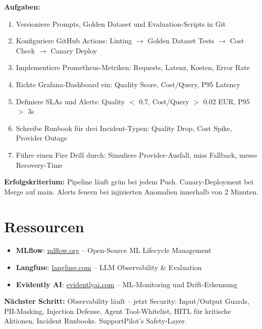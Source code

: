 \textbf{Aufgaben:}
\begin{enumerate}[leftmargin=*]
    \item Versioniere Prompts, Golden Dataset und Evaluation-Scripts in Git
    \item Konfiguriere GitHub Actions: Linting $\rightarrow$ Golden Dataset Tests $\rightarrow$ Cost Check $\rightarrow$ Canary Deploy
    \item Implementiere Prometheus-Metriken: Requests, Latenz, Kosten, Error Rate
    \item Richte Grafana-Dashboard ein: Quality Score, Cost/Query, P95 Latency
    \item Definiere SLAs und Alerts: Quality $<$ 0.7, Cost/Query $>$ 0.02 EUR, P95 $>$ 3s
    \item Schreibe Runbook für drei Incident-Typen: Quality Drop, Cost Spike, Provider Outage
    \item Führe einen Fire Drill durch: Simuliere Provider-Ausfall, miss Fallback, messe Recovery-Time
\end{enumerate}

\textbf{Erfolgskriterium:} Pipeline läuft grün bei jedem Push. Canary-Deployment bei Merge auf main. Alerts feuern bei injizierten Anomalien innerhalb von 2 Minuten.

\section{Ressourcen}

\begin{itemize}[leftmargin=*]
    \item \textbf{MLflow}: \href{https://mlflow.org}{mlflow.org} -- Open-Source ML Lifecycle Management
    \item \textbf{Langfuse}: \href{https://langfuse.com}{langfuse.com} -- LLM Observability \& Evaluation
    \item \textbf{Evidently AI}: \href{https://www.evidentlyai.com}{evidentlyai.com} -- ML-Monitoring und Drift-Erkennung
\end{itemize}

\textbf{Nächster Schritt:} Observability läuft -- jetzt Security: Input/Output Guards, PII-Masking, Injection Defense, Agent Tool-Whitelist, HITL für kritische Aktionen, Incident Runbooks. SupportPilot's Safety-Layer.
\endinput

\clearpage
